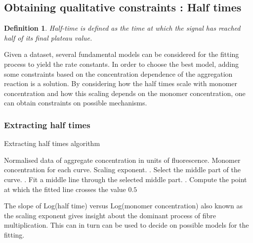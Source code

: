 \documentclass[11pt,a4paper]{article}
\newtheorem{defn}[theorem]{Definition}
\begin{document}
\subsection{Obtaining qualitative constraints : Half times}
\begin{defn}{} Half-time is defined as the time at which the signal has reached half of its final plateau value. \end{defn}

Given a dataset, several fundamental models can be considered for the fitting process to yield the rate constants. In order to choose the best model, adding some constraints based on the concentration dependence of the aggregation reaction is a solution. By considering how the half times scale with monomer concentration and how this scaling
depends on the monomer concentration, one can obtain constraints on possible mechanisms.

\subsubsection{Extracting half times}
\begin{algorithm}[!h]                     %
\caption{Extracting half times algorithm}       %
\begin{algorithmic}                       %
\REQUIRE Normalised data of aggregate concentration in units of fluorescence.
\REQUIRE Monomer concentration for each curve.
\ENSURE Scaling exponent.
    . Select the middle part of the curve.
    . Fit a middle line through the selected middle part.
    . Compute the point at which the fitted line crosses the value $0.5$
\ENDFOR
\end{algorithmic}
\label{alg:Gillespie's Direct Method}
\end{algorithm}

The slope of Log(half time) versus Log(monomer concentration) also known as the scaling exponent gives insight about the dominant process of fibre multiplication. This can in turn can be used to decide on possible models for the fitting.
\end{document}
